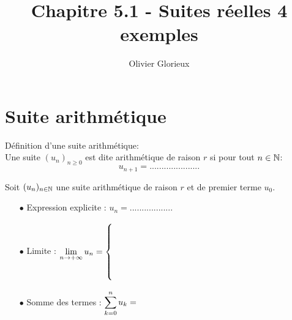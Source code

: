 \documentclass[a4paper, 11pt]{article}
\author{Olivier Glorieux}
\begin{document}
\title{Chapitre 5.1 - Suites réelles 4 exemples}


\section{Suite arithm\'etique}


\begin{defi} D\'efinition d'une suite arithm\'etique:\\
Une suite $(u_n)_{n\geq 0}$ est dite arithm\'etique de raison $r$ si pour tout $n\in \mathbb{N}$:
$$ u_{n+1}=.....................$$
\end{defi}



{  

\begin{prop} Soit $(u_n)_{n\in \mathbb{N}}$ une suite arithm\'etique de raison $r$ et de premier terme $u_0$.\vspace{0.3cm}
\begin{itemize}
\item[$\bullet$] Expression explicite : $u_n =..................$ 
\item[$\bullet$] Limite : $\lim\limits_{n\to +\infty} u_n = \left\{ \begin{array}{c} \vspace*{2cm} \end{array} \right.$
\item[$\bullet$] Somme des termes : $\displaystyle \sum\limits_{k=0}^n u_k = $
\end{itemize}
\end{prop}

}

\end{document}
